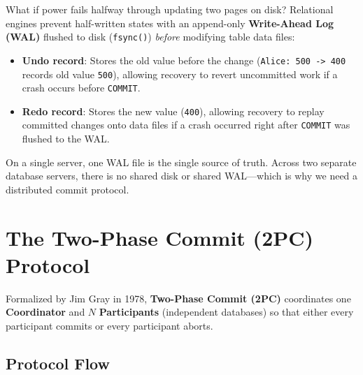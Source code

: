What if power fails halfway through updating two pages on disk? Relational engines prevent half-written states with an append-only \textbf{Write-Ahead Log (WAL)} flushed to disk (\texttt{fsync()}) \emph{before} modifying table data files:
\begin{itemize}[leftmargin=18pt]
  \item \textbf{Undo record}: Stores the old value before the change (\texttt{Alice: 500 -> 400} records old value \texttt{500}), allowing recovery to revert uncommitted work if a crash occurs before \texttt{COMMIT}.
  \item \textbf{Redo record}: Stores the new value (\texttt{400}), allowing recovery to replay committed changes onto data files if a crash occurred right after \texttt{COMMIT} was flushed to the WAL.
\end{itemize}
On a single server, one WAL file is the single source of truth. Across two separate database servers, there is no shared disk or shared WAL---which is why we need a distributed commit protocol.

\section{The Two-Phase Commit (2PC) Protocol}

Formalized by Jim Gray in 1978, \textbf{Two-Phase Commit (2PC)} coordinates one \textbf{Coordinator} and $N$ \textbf{Participants} (independent databases) so that either every participant commits or every participant aborts.

\subsection{Protocol Flow}

